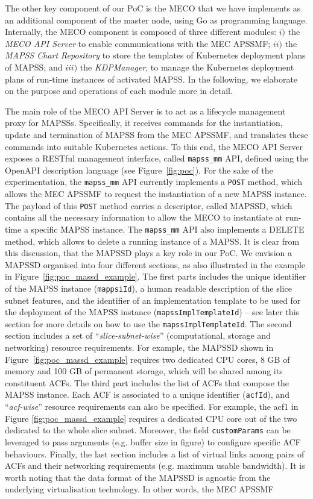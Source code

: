 The other key component of our PoC is the MECO that we have implements as an additional component of the master node, using Go as programming language. Internally, the MECO component is composed of three different modules: $i)$ the \textit{MECO API Server} to enable communications with the MEC APSSMF; $ii)$ the \textit{MAPSS Chart Repository} to store the templates of Kubernetes deployment plans of MAPSS; and $iii)$ the \textit{KDPManager}, to manage the Kubernetes deployment plans of run-time instances of activated MAPSS. In the following, we elaborate on the purpose and operations of each module more in detail. 

The main role of the MECO API Server is to act as a lifecycle management proxy for MAPSSs. Specifically, it receives commands for the instantiation, update and termination of MAPSS from the MEC APSSMF, and translates these commands into suitable Kubernetes actions. To this end, the MECO API Server exposes a RESTful management interface, called \texttt{mapss\_mm} API, defined using the OpenAPI description language (see Figure~\ref{fig:poc}). For the sake of the experimentation, the \texttt{mapss\_mm} API currently implements a \texttt{POST} method, which allows the MEC APSSMF to request the instantiation of a new MAPSS instance. The payload of this \texttt{POST} method carries a descriptor, called MAPSSD, which contains all the necessary information to allow the MECO to instantiate at run-time a specific MAPSS instance. The \texttt{mapss\_mm} API also implements a DELETE method, which allows to delete a running instance of a MAPSS. It is clear from this discussion, that the MAPSSD plays a key role in our PoC. We envision a MAPSSD organised into four different sections, as also illustrated in the example in Figure~\ref{fig:poc_massd_example}. The first parts includes the unique identifier of the MAPSS instance (\texttt{mappsiId}), a human readable description of the slice subnet features, and the identifier of an implementation template to be used for the deployment of the MAPSS instance (\texttt{mapssImplTemplateId}) -- see later this section for more details on how to use the \texttt{mapssImplTemplateId}. The second section includes a set of ``\textit{slice-subnet-wise}'' (computational, storage and networking) resource requirements. For example, the MAPSSD shown in Figure~\ref{fig:poc_massd_example} requires two dedicated CPU cores, 8 GB of memory and 100 GB of permanent storage, which will be shared among its constituent ACFs. The third part includes the list of ACFs that compose the MAPSS instance. Each ACF is associated to a unique identifier (\texttt{acfId}), and ``\textit{acf-wise}'' resource requirements can also be specified. For example, the acf1 in Figure \ref{fig:poc_massd_example} requires a dedicated CPU core out of the two dedicated to the whole slice subnet. Moreover, the field \texttt{customParams} can be leveraged to pass arguments (e.g. buffer size in figure) to configure specific ACF behaviours. Finally, the last section includes a list of virtual links among pairs of ACFs and their networking requirements (e.g. maximum usable bandwidth). It is worth noting that the data format of the MAPSSD is agnostic from the underlying virtualisation technology. In other words, the MEC APSSMF 